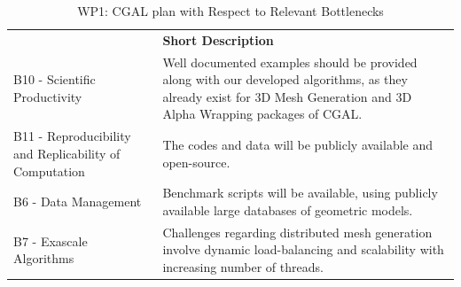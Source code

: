 \begin{table}[h!]
    \centering
    
    

    \centering
    { 
        \setlength{\parindent}{0pt}
        \def\arraystretch{1.25}
        {
            \fontsize{9}{11}\selectfont
            \begin{tabular}{!{\color{numpexgray}\vrule}p{.25\linewidth}!{\color{numpexgray}\vrule}p{.6885\linewidth}!{\color{numpexgray}\vrule}}
    
     &  {\rule{0pt}{2.5ex}\color{white}\bf Short Description }\\ 
    
    B10 - Scientific Productivity & Well documented examples should be provided along with our developed algorithms, as they already exist for 3D Mesh Generation and 3D Alpha Wrapping packages of CGAL.  \\
    B11 - Reproducibility and Replicability of Computation & The codes and data will be publicly available and open-source. \\
    B6 - Data Management & Benchmark scripts will be available, using publicly available large databases of geometric models. \\
    B7 - Exascale Algorithms & Challenges regarding distributed mesh generation involve dynamic load-balancing and scalability with increasing number of threads. \\
\end{tabular}
        }
    }
    \caption{WP1: CGAL plan with Respect to Relevant Bottlenecks}
    \label{tab:WP1:CGAL:bottlenecks}
\end{table}





